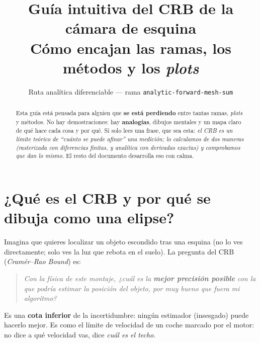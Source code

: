 \documentclass[11pt,a4paper]{article}
\title{\textbf{Gu\'ia intuitiva del CRB de la c\'amara de esquina}\\[2mm]
\large C\'omo encajan las ramas, los m\'etodos y los \emph{plots}}
\author{Ruta anal\'itica diferenciable --- rama \texttt{analytic-forward-mesh-sum}}
\date{}
\begin{document}
\maketitle

\begin{abstract}
\noindent Esta gu\'ia est\'a pensada para alguien que \textbf{se est\'a perdiendo}
entre tantas ramas, \emph{plots} y m\'etodos. No hay demostraciones: hay
\textbf{analog\'ias}, dibujos mentales y un mapa claro de qu\'e hace cada cosa y
por qu\'e. Si solo lees una frase, que sea esta: \emph{el CRB es un l\'imite
te\'orico de ``cu\'anto se puede afinar'' una medici\'on; lo calculamos de dos
maneras (rasterizada con diferencias finitas, y anal\'itica con derivadas
exactas) y comprobamos que dan lo mismo}. El resto del documento desarrolla eso
con calma.
\end{abstract}

\tableofcontents
\bigskip

\section{¿Qu\'e es el CRB y por qu\'e se dibuja como una elipse?}

Imagina que quieres localizar un objeto escondido tras una esquina (no lo ves
directamente; solo ves la luz que rebota en el suelo). La pregunta del CRB
(\emph{Cram\'er--Rao Bound}) es:

\begin{quote}
\textit{Con la f\'isica de este montaje, ¿cu\'al es la \textbf{mejor precisi\'on
posible} con la que podr\'ia estimar la posici\'on del objeto, por muy bueno que
fuera mi algoritmo?}
\end{quote}

Es una \textbf{cota inferior} de la incertidumbre: ning\'un estimador (insesgado)
puede hacerlo mejor. Es como el l\'imite de velocidad de un coche marcado por el
motor: no dice a qu\'e velocidad vas, dice \emph{cu\'al es el techo}.
\end{document}
